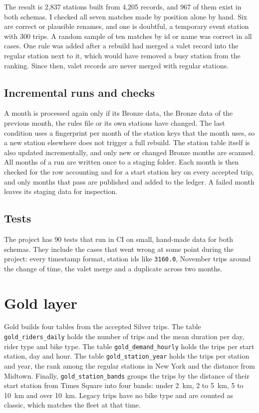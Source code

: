\documentclass[11pt,a4paper]{article}
\newcommand{\code}[1]{\texttt{\small #1}}
\begin{document}
The result is 2,837 stations built from 4,205 records, and 967 of them exist in both schemas. I checked all seven matches
made by position alone by hand. Six are correct or plausible renames, and one is doubtful, a temporary event station with
300 trips. A random sample of ten matches by id or name was correct in all cases. One rule was added after a rebuild had merged a valet record into the regular station next
to it, which would have removed a busy station from the ranking. Since then, valet records are never merged with regular
stations.

\subsection{Incremental runs and checks}

A month is processed again only if its Bronze data, the Bronze data of the previous month, the rules file or its own
stations have changed. The last condition uses a fingerprint per month of the station keys that the month uses, so a new
station elsewhere does not trigger a full rebuild. The station table itself is also updated incrementally, and only new or
changed Bronze months are scanned. All months of a run are written once to a staging folder. Each month is then checked
for the row accounting and for a start station key on every accepted trip, and only months that pass are published and
added to the ledger. A failed month leaves its staging data for inspection.

\subsection{Tests}

The project has 90 tests that run in CI on small, hand-made data for both schemas. They include the cases that went wrong
at some point during the project: every timestamp format, station ids like \code{3160.0}, November trips around the change
of time, the valet merge and a duplicate across two months.

\section{Gold layer}

Gold builds four tables from the accepted Silver trips. The table \code{gold\_riders\_daily} holds the number of trips and
the mean duration per day, rider type and bike type. The table \code{gold\_demand\_hourly} holds the trips per start
station, day and hour. The table \code{gold\_station\_year} holds the trips per station and year, the rank among the
regular stations in New York and the distance from Midtown. Finally, \code{gold\_station\_bands} groups the trips by the
distance of their start station from Times Square into four bands: under 2~km, 2 to 5~km, 5 to 10~km and over 10~km. Legacy
trips have no bike type and are counted as classic, which matches the fleet at that time.
\end{document}
